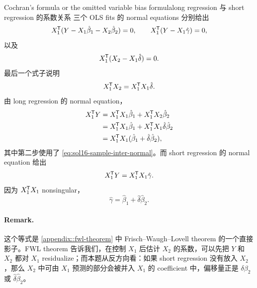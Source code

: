 \begin{exercisesolution}{Cochran's formula or the omitted variable bias formula}{long regression 与 short regression 的系数关系}
三个 OLS fits 的 normal equations 分别给出
\[
X_1^{\mkern-1.5mu\mathsf{T}}(Y-X_1\hat\beta_1-X_2\hat\beta_2)=0,\qquad
X_1^{\mkern-1.5mu\mathsf{T}}(Y-X_1\hat\gamma)=0,
\]
以及
\[
X_1^{\mkern-1.5mu\mathsf{T}}(X_2-X_1\hat\delta)=0.
\]
最后一个式子说明
\begin{equation}
\label{eq:sol16-sample-inter-normal}
X_1^{\mkern-1.5mu\mathsf{T}} X_2=X_1^{\mkern-1.5mu\mathsf{T}} X_1\hat\delta.
\end{equation}
由 long regression 的 normal equation，
\begin{align*}
X_1^{\mkern-1.5mu\mathsf{T}} Y
&=X_1^{\mkern-1.5mu\mathsf{T}} X_1\hat\beta_1+X_1^{\mkern-1.5mu\mathsf{T}} X_2\hat\beta_2\\
&=X_1^{\mkern-1.5mu\mathsf{T}} X_1\hat\beta_1+X_1^{\mkern-1.5mu\mathsf{T}} X_1\hat\delta\hat\beta_2\\
&=X_1^{\mkern-1.5mu\mathsf{T}} X_1(\hat\beta_1+\hat\delta\hat\beta_2),
\end{align*}
其中第二步使用了 \cref{eq:sol16-sample-inter-normal}。而 short regression 的 normal equation 给出
\[
X_1^{\mkern-1.5mu\mathsf{T}} Y=X_1^{\mkern-1.5mu\mathsf{T}} X_1\hat\gamma.
\]
因为 $X_1^{\mkern-1.5mu\mathsf{T}} X_1$ nonsingular，
\[
\hat\gamma=\hat\beta_1+\hat\delta\hat\beta_2.
\]

\paragraph{Remark.}
这个等式是 \cref{appendix::fwl-theorem} 中 Frisch--Waugh--Lovell theorem 的一个直接影子。FWL theorem 告诉我们，在控制 $X_1$ 后估计 $X_2$ 的系数，可以先把 $Y$ 和 $X_2$ 都对 $X_1$ residualize；而本题从反方向看：如果 short regression 没有放入 $X_2$，那么 $X_2$ 中可由 $X_1$ 预测的部分会被并入 $X_1$ 的 coefficient 中，偏移量正是 $\delta\beta_2$ 或 $\hat\delta\hat\beta_2$。
\end{exercisesolution}
